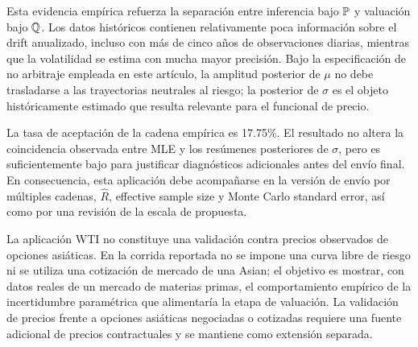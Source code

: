 Esta evidencia empírica refuerza la separación entre inferencia bajo $\mathbb{P}$ y valuación bajo $\mathbb{Q}$. Los datos históricos contienen relativamente poca información sobre el drift anualizado, incluso con más de cinco años de observaciones diarias, mientras que la volatilidad se estima con mucha mayor precisión. Bajo la especificación de no arbitraje empleada en este artículo, la amplitud posterior de $\mu$ no debe trasladarse a las trayectorias neutrales al riesgo; la posterior de $\sigma$ es el objeto históricamente estimado que resulta relevante para el funcional de precio.

La tasa de aceptación de la cadena empírica es 17.75\%. El resultado no altera la coincidencia observada entre MLE y los resúmenes posteriores de $\sigma$, pero es suficientemente bajo para justificar diagnósticos adicionales antes del envío final. En consecuencia, esta aplicación debe acompañarse en la versión de envío por múltiples cadenas, $\widehat R$, effective sample size y Monte Carlo standard error, así como por una revisión de la escala de propuesta.

La aplicación WTI no constituye una validación contra precios observados de opciones asiáticas. En la corrida reportada no se impone una curva libre de riesgo ni se utiliza una cotización de mercado de una Asian; el objetivo es mostrar, con datos reales de un mercado de materias primas, el comportamiento empírico de la incertidumbre paramétrica que alimentaría la etapa de valuación. La validación de precios frente a opciones asiáticas negociadas o cotizadas requiere una fuente adicional de precios contractuales y se mantiene como extensión separada.
